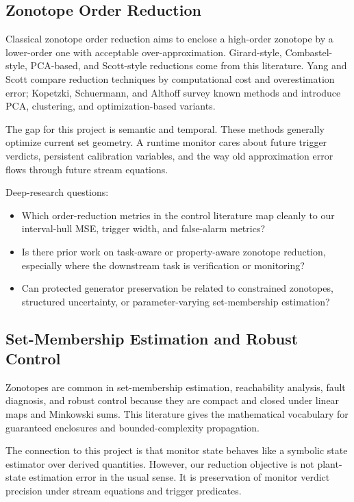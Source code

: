 \documentclass[11pt]{article}
\begin{document}
\subsection{Zonotope Order Reduction}

Classical zonotope order reduction aims to enclose a high-order zonotope by a
lower-order one with acceptable over-approximation. Girard-style,
Combastel-style, PCA-based, and Scott-style reductions come from this
literature. Yang and Scott compare reduction techniques by computational cost
and overestimation error; Kopetzki, Schuermann, and Althoff survey known
methods and introduce PCA, clustering, and optimization-based variants.

The gap for this project is semantic and temporal. These methods generally
optimize current set geometry. A runtime monitor cares about future trigger
verdicts, persistent calibration variables, and the way old approximation error
flows through future stream equations.

Deep-research questions:

\begin{itemize}
\item Which order-reduction metrics in the control literature map cleanly to
our interval-hull MSE, trigger width, and false-alarm metrics?
\item Is there prior work on task-aware or property-aware zonotope reduction,
especially where the downstream task is verification or monitoring?
\item Can protected generator preservation be related to constrained zonotopes,
structured uncertainty, or parameter-varying set-membership estimation?
\end{itemize}

\subsection{Set-Membership Estimation and Robust Control}

Zonotopes are common in set-membership estimation, reachability analysis,
fault diagnosis, and robust control because they are compact and closed under
linear maps and Minkowski sums. This literature gives the mathematical
vocabulary for guaranteed enclosures and bounded-complexity propagation.

The connection to this project is that monitor state behaves like a symbolic
state estimator over derived quantities. However, our reduction objective is
not plant-state estimation error in the usual sense. It is preservation of
monitor verdict precision under stream equations and trigger predicates.
\end{document}
